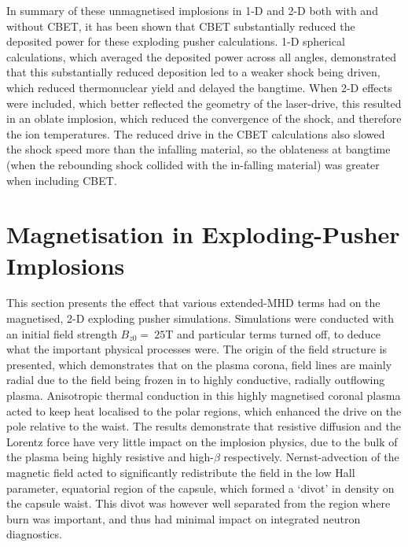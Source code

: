 In summary of these unmagnetised implosions in 1-D and 2-D both with and without \ac{CBET}, it has been shown that \ac{CBET} substantially reduced the deposited power for these exploding pusher calculations.
1-D spherical calculations, which averaged the deposited power across all angles, demonstrated that this substantially reduced deposition led to a weaker shock being driven, which reduced thermonuclear yield and delayed the bangtime.
When 2-D effects were included, which better reflected the geometry of the laser-drive, this resulted in an oblate implosion, which reduced the convergence of the shock, and therefore the ion temperatures.
The reduced drive in the \ac{CBET} calculations also slowed the shock speed more than the infalling material, so the oblateness at bangtime (when the rebounding shock collided with the in-falling material) was greater when including \ac{CBET}.

\section{Magnetisation in Exploding-Pusher Implosions}%
\label{sec:Res2_mag_unmag}

This section presents the effect that various extended-\ac{MHD} terms had on the magnetised, 2-D exploding pusher simulations.
Simulations were conducted with an initial field strength $B_{z0}=\ 25\text{T}$ and particular terms turned off, to deduce what the important physical processes were.
The origin of the field structure is presented, which demonstrates that on the plasma corona, field lines are mainly radial due to the field being frozen in to highly conductive, radially outflowing plasma.
Anisotropic thermal conduction in this highly magnetised coronal plasma acted to keep heat localised to the polar regions, which enhanced the drive on the pole relative to the waist.
The results demonstrate that resistive diffusion and the Lorentz force have very little impact on the implosion physics, due to the bulk of the plasma being highly resistive and high-$\beta$ respectively.
Nernst-advection of the magnetic field acted to significantly redistribute the field in the low Hall parameter, equatorial region of the capsule, which formed a `divot' in density on the capsule waist.
This divot was however well separated from the region where burn was important, and thus had minimal impact on integrated neutron diagnostics.

